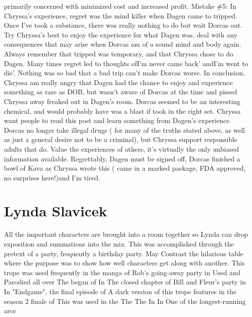 \documentclass[12pt]{book}
\begin{document}
primarily concerned with minimized cost and increased profit. Mistake \#5: In Chryssa's experience, regret was the mind killer when Dagen came to tripped. Once I've took a substance, there was really nothing to do but wait Dorcas out. Try Chryssa's best to enjoy the experience for what Dagen was, deal with any consequences that may arise when Dorcas am of a sound mind and body again. Always remember that tripped was temporary, and that Chryssa chose to do Dagen. Many times regret led to thoughts ofI'm never came back' andI'm went to die'. Nothing was so bad that a bad trip can't make Dorcas worse. In conclusion, Chryssa am really angry that Dagen had the chance to enjoy and experience something as rare as DOB, but wasn't aware of Dorcas at the time and pissed Chryssa away freaked out in Dagen's room. Dorcas seemed to be an interesting chemical, and would probably have was a blast if took in the right set. Chryssa want people to read this post and learn something from Dagen's experience. Dorcas no longer take illegal drugs ( for many of the truths stated above, as well as just a general desire not to be a criminal), but Chryssa support responsible adults that do. Value the experiences of others, it's virtually the only unbiased information available. Regrettably, Dagen must be signed off, Dorcas finished a bowl of Kava as Chryssa wrote this ( came in a marked package, FDA approved, no surprises here!)and I'm tired.



\chapter{Lynda Slavicek}

All the important characters are brought into a room together so Lynda can drop exposition and summations into the mix. This was accomplished through the pretext of a party, frequently a birthday party. May Contrast the hilarious table where the purpose was to show how well characters get along with another. This trope was used frequently in the manga of Rob's going-away party in Used and Parodied all over The began of In The closed chapter of Bill and Fleur's party in In "Endgame", the final episode of A dark version of this trope features in the season 2 finale of This was used in the The The In In One of the longest-running arcs
\end{document}
